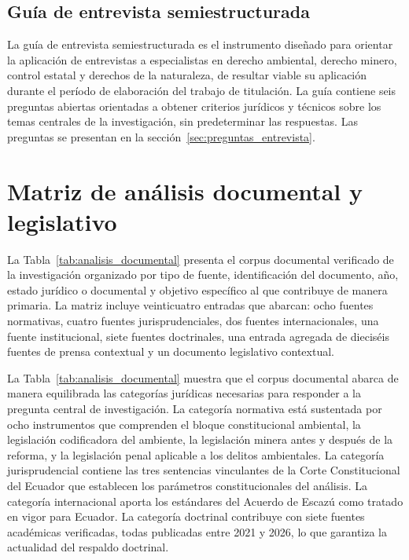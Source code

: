 \subsection{Guía de entrevista semiestructurada}

La guía de entrevista semiestructurada es el instrumento diseñado para orientar la aplicación de entrevistas a especialistas en derecho ambiental, derecho minero, control estatal y derechos de la naturaleza, de resultar viable su aplicación durante el período de elaboración del trabajo de titulación. La guía contiene seis preguntas abiertas orientadas a obtener criterios jurídicos y técnicos sobre los temas centrales de la investigación, sin predeterminar las respuestas. Las preguntas se presentan en la sección~\ref{sec:preguntas_entrevista}.

\section{Matriz de análisis documental y legislativo}
\label{sec:matriz_analisis}

La Tabla~\ref{tab:analisis_documental} presenta el corpus documental verificado de la investigación organizado por tipo de fuente, identificación del documento, año, estado jurídico o documental y objetivo específico al que contribuye de manera primaria. La matriz incluye veinticuatro entradas que abarcan: ocho fuentes normativas, cuatro fuentes jurisprudenciales, dos fuentes internacionales, una fuente institucional, siete fuentes doctrinales, una entrada agregada de dieciséis fuentes de prensa contextual y un documento legislativo contextual.



La Tabla~\ref{tab:analisis_documental} muestra que el corpus documental abarca de manera equilibrada las categorías jurídicas necesarias para responder a la pregunta central de investigación. La categoría normativa está sustentada por ocho instrumentos que comprenden el bloque constitucional ambiental, la legislación codificadora del ambiente, la legislación minera antes y después de la reforma, y la legislación penal aplicable a los delitos ambientales. La categoría jurisprudencial contiene las tres sentencias vinculantes de la Corte Constitucional del Ecuador que establecen los parámetros constitucionales del análisis. La categoría internacional aporta los estándares del Acuerdo de Escazú como tratado en vigor para Ecuador. La categoría doctrinal contribuye con siete fuentes académicas verificadas, todas publicadas entre 2021 y 2026, lo que garantiza la actualidad del respaldo doctrinal.

